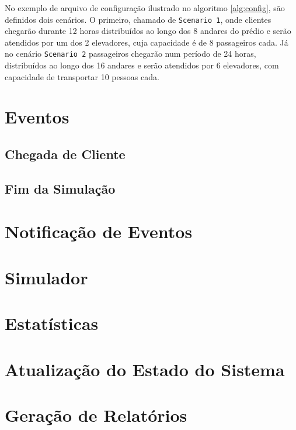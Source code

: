 No exemplo de arquivo de configuração ilustrado no algoritmo \ref{alg:config},
são definidos dois cenários. O primeiro, chamado de \texttt{Scenario 1}, onde
clientes chegarão durante 12 horas distribuídos ao longo dos 8 andares do prédio
e serão atendidos por um dos 2 elevadores, cuja capacidade é de 8 passageiros
cada. Já no cenário \texttt{Scenario 2} passageiros chegarão num período de 24
horas, distribuídos ao longo dos 16 andares e serão atendidos por 6 elevadores,
com capacidade  de transportar 10 pessoas cada.

\section{\label{model:events}Eventos}
\lipsum[2]

\subsection{\label{model:events:clientarrival}Chegada de Cliente}
\lipsum[1]

\subsection{\label{model:events:end}Fim da Simulação}
\lipsum[1]

\section{\label{model:notification}Notificação de Eventos}
\lipsum[3]

\section{\label{model:simulator}Simulador}
\lipsum[6]

\section{\label{model:statistics}Estatísticas}
\lipsum[4]

\section{\label{model:state}Atualização do Estado do Sistema}
\lipsum[1]

\section{\label{model:report}Geração de Relatórios}
\lipsum[5]


